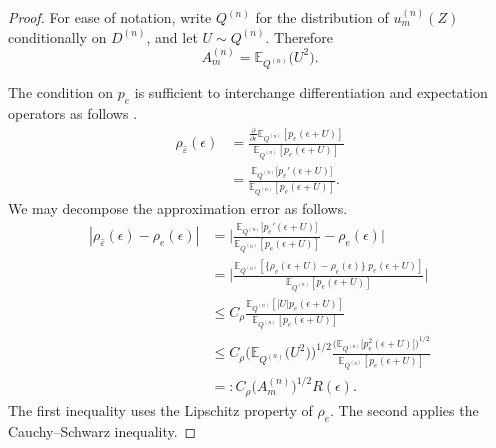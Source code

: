 \documentclass[aos]{imsart}
\newcommand{\E}{\mathbb{E}}
\begin{document}
	\begin{proof}
		For ease of notation, write $Q^{(n)}$ for the distribution of $u_m^{(n)}(Z)$ conditionally on $D^{(n)}$, and let $U\sim Q^{(n)}$. Therefore \begin{equation*}
			A_m^{(n)} = \E_{Q^{(n)}} \big(U^2\big).
		\end{equation*}
		
		
		The condition on $p_{e}$ is sufficient to interchange differentiation and expectation operators as follows \citep[Thm.~20.4]{AliprantisAnalysis}. 
		\begin{align*}
			\rho_{\hat\varepsilon}(\epsilon)  &= \frac{\frac{\partial}{\partial \epsilon}\E_{Q^{(n)}}[p_{e}(\epsilon + U) ]}{\E_{Q^{(n)}}[p_{e}(\epsilon + U)]}\\
			&=  \frac{\E_{Q^{(n)}}\big[p_{e}'(\epsilon + U) \big]}{\E_{Q^{(n)}}[p_{e}(\epsilon + U) ]}.
		\end{align*}
		We may decompose the approximation error as follows.
		\begin{align*}
			|\rho_{\hat\varepsilon}(\epsilon) - \rho_{e}(\epsilon)| &= \bigg|\frac{\E_{Q^{(n)}} \big[p_{e}'(\epsilon+U)\big] }{\E_{Q^{(n)}} [p_{e}(\epsilon+U)]} - \rho_{e}(\epsilon) \bigg| \\
			&=\bigg|\frac{\E_{Q^{(n)}} [\{\rho_{e}(\epsilon+U)-\rho_{e}(\epsilon)\}\;p_{e}(\epsilon+U)] }{\E_{Q^{(n)}} [p_{e}(\epsilon+U)]}\bigg| \\
			&\leq C_\rho \frac{\E_{Q^{(n)}} [|U|p_{e}(\epsilon+U)] }{\E_{Q^{(n)}} [p_{e}(\epsilon+U)]}\\
			&\leq C_\rho \Big(\E_{Q^{(n)}} \big(U^2\big)\Big)^{1/2} \frac{\Big( \E_{Q^{(n)}}\big[p_{e}^2(\epsilon+U)\big]\Big)^{1/2}}{\E_{Q^{(n)}} [p_{e}(\epsilon+U)]}\\
			&=: C_\rho \big(A_m^{(n)}\big)^{1/2} R(\epsilon).
		\end{align*}
		The first inequality uses the Lipschitz property of $\rho_{e}$. The second applies the Cauchy--Schwarz inequality.
		

\end{proof}
\end{document}
